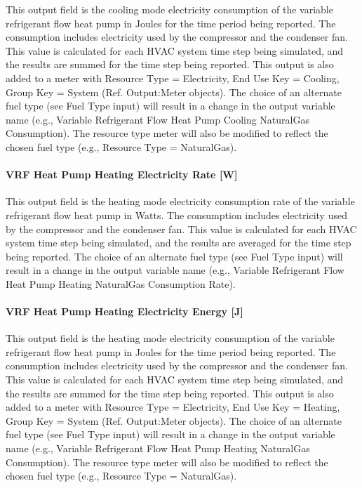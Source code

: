 This output field is the cooling mode electricity consumption of the variable refrigerant flow heat pump in Joules for the time period being reported. The consumption includes electricity used by the compressor and the condenser fan. This value is calculated for each HVAC system time step being simulated, and the results are summed for the time step being reported. This output is also added to a meter with Resource Type = Electricity, End Use Key = Cooling, Group Key = System (Ref. Output:Meter objects). The choice of an alternate fuel type (see Fuel Type input) will result in a change in the output variable name (e.g., Variable Refrigerant Flow Heat Pump Cooling NaturalGas Consumption). The resource type meter will also be modified to reflect the chosen fuel type (e.g., Resource Type = NaturalGas).

\paragraph{VRF Heat Pump Heating Electricity Rate {[}W{]}}\label{vrf-heat-pump-heating-electric-power-w}

This output field is the heating mode electricity consumption rate of the variable refrigerant flow heat pump in Watts. The consumption includes electricity used by the compressor and the condenser fan. This value is calculated for each HVAC system time step being simulated, and the results are averaged for the time step being reported. The choice of an alternate fuel type (see Fuel Type input) will result in a change in the output variable name (e.g., Variable Refrigerant Flow Heat Pump Heating NaturalGas Consumption Rate).

\paragraph{VRF Heat Pump Heating Electricity Energy {[}J{]}}\label{vrf-heat-pump-heating-electric-energy-j}

This output field is the heating mode electricity consumption of the variable refrigerant flow heat pump in Joules for the time period being reported. The consumption includes electricity used by the compressor and the condenser fan. This value is calculated for each HVAC system time step being simulated, and the results are summed for the time step being reported. This output is also added to a meter with Resource Type = Electricity, End Use Key = Heating, Group Key = System (Ref. Output:Meter objects). The choice of an alternate fuel type (see Fuel Type input) will result in a change in the output variable name (e.g., Variable Refrigerant Flow Heat Pump Heating NaturalGas Consumption). The resource type meter will also be modified to reflect the chosen fuel type (e.g., Resource Type = NaturalGas).


